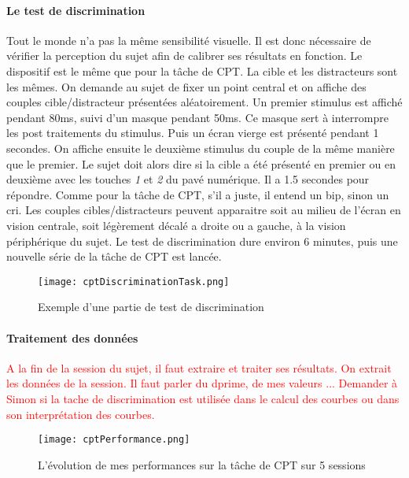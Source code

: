 \paragraph{Le test de discrimination}Tout le monde n'a pas la même sensibilité visuelle. Il est donc nécessaire de vérifier la perception du sujet afin de calibrer ses résultats en
fonction. Le dispositif est le même que pour la tâche de CPT. La cible et les distracteurs sont les mêmes. On demande au sujet de fixer un point central et on affiche des couples
cible/distracteur présentées aléatoirement. Un premier stimulus est affiché pendant 80ms, suivi d'un masque pendant 50ms. Ce masque sert à interrompre les post traitements du
stimulus. Puis un écran vierge est présenté pendant 1 secondes. On affiche ensuite le deuxième stimulus du couple de la même manière que le premier. Le sujet doit alors dire si la
cible a été présenté en premier ou en deuxième avec les touches \emph{1} et \emph{2} du pavé numérique. Il a 1.5 secondes pour répondre. Comme pour la tâche de CPT, s'il a juste, il
entend un bip, sinon un cri. Les couples cibles/distracteurs peuvent apparaitre soit au milieu de l'écran en vision centrale, soit légèrement décalé a droite ou a gauche, à la vision
périphérique du sujet. Le test de discrimination dure environ 6 minutes, puis une nouvelle série de la tâche de CPT est lancée.

\begin{figure}[H]
    \begin{center}
    \texttt{[image: cptDiscriminationTask.png]}
    \end{center}
    \caption{Exemple d'une partie de test de discrimination}
\label{CptDiscriminationTask}
\end{figure}

\paragraph{Traitement des données}\textcolor{red}{A la fin de la session du sujet, il faut extraire et traiter ses résultats. 
On extrait les données de la session. Il faut parler du dprime, de mes valeurs ... Demander à Simon si la tache de discrimination est utilisée dans le
calcul des courbes ou dans son interprétation des courbes.}

\begin{figure}[H]
    \begin{center}
    \texttt{[image: cptPerformance.png]}
    \end{center}
    \caption{L'évolution de mes performances sur la tâche de CPT sur 5 sessions}
\label{CptPerformance}
\end{figure}

